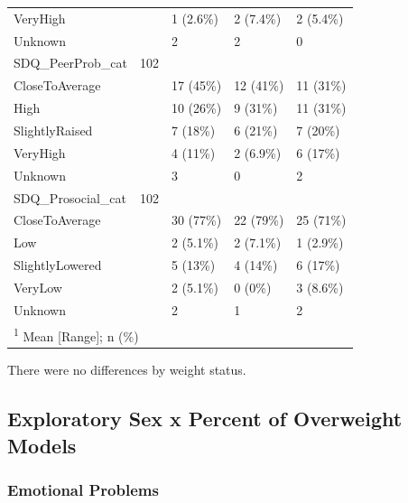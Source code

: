 \documentclass[
]{article}
\begin{document}
\begin{table}[!h]
\begin{tabular}[t]{lllll}
\hspace{1em}VeryHigh &  & 1 (2.6\%) & 2 (7.4\%) & 2 (5.4\%)\\
\addlinespace
\hspace{1em}Unknown &  & 2 & 2 & 0\\
SDQ\_PeerProb\_cat & 102 &  &  & \\
\hspace{1em}CloseToAverage &  & 17 (45\%) & 12 (41\%) & 11 (31\%)\\
\hspace{1em}High &  & 10 (26\%) & 9 (31\%) & 11 (31\%)\\
\hspace{1em}SlightlyRaised &  & 7 (18\%) & 6 (21\%) & 7 (20\%)\\
\addlinespace
\hspace{1em}VeryHigh &  & 4 (11\%) & 2 (6.9\%) & 6 (17\%)\\
\hspace{1em}Unknown &  & 3 & 0 & 2\\
SDQ\_Prosocial\_cat & 102 &  &  & \\
\hspace{1em}CloseToAverage &  & 30 (77\%) & 22 (79\%) & 25 (71\%)\\
\hspace{1em}Low &  & 2 (5.1\%) & 2 (7.1\%) & 1 (2.9\%)\\
\addlinespace
\hspace{1em}SlightlyLowered &  & 5 (13\%) & 4 (14\%) & 6 (17\%)\\
\hspace{1em}VeryLow &  & 2 (5.1\%) & 0 (0\%) & 3 (8.6\%)\\
\hspace{1em}Unknown &  & 2 & 1 & 2\\
\bottomrule
\multicolumn{5}{l}{\rule{0pt}{1em}\textsuperscript{1} Mean [Range]; n (\%)}\\
\end{tabular}
\end{table}

There were no differences by weight status.

\hypertarget{exploratory-sex-x-percent-of-overweight-models}{%
\subsection{Exploratory Sex x Percent of Overweight
Models}\label{exploratory-sex-x-percent-of-overweight-models}}

\hypertarget{emotional-problems}{%
\subsubsection{Emotional Problems}\label{emotional-problems}}
\end{document}
